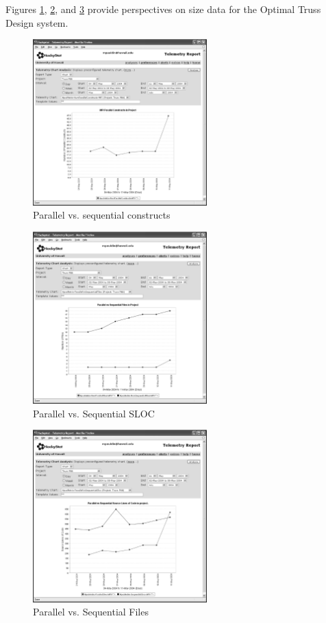 \documentclass[times,10pt,twocolumn]{article}
\begin{document}
Figures \ref{fig:parallelconstructs}, \ref{fig:parallelfiles},
and \ref{fig:parallelvsequential} provide perspectives on
size data for the Optimal Truss Design system.

\begin{figure}[htpb]
  \centering
  \includegraphics[width=0.60\textwidth]{truss.parallelconstructs.eps}
  \caption{Parallel vs. sequential constructs}
  \label{fig:parallelconstructs}
\end{figure}

\begin{figure}[htpb]
  \centering
  \includegraphics[width=0.60\textwidth]{truss.parallelfiles.eps}
  \caption{Parallel vs. Sequential SLOC}
  \label{fig:parallelfiles}
\end{figure}

\begin{figure}[htpb]
  \centering
  \includegraphics[width=0.60\textwidth]{truss.parallelvsequential.eps}
  \caption{Parallel vs. Sequential Files}
  \label{fig:parallelvsequential}
\end{figure}
\end{document}
